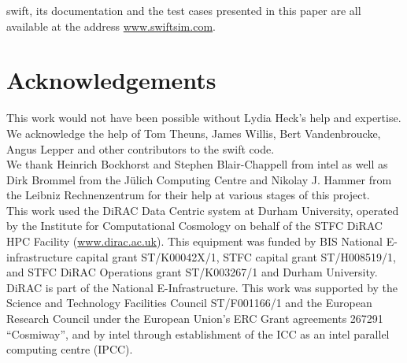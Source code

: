 \documentclass{sig-alternate-05-2015}
\newcommand{\swift}{{\sc swift}\xspace}
\newcommand{\web}{\url{www.swiftsim.com}}
\begin{document}
\swift, its documentation and the test cases presented in this paper are all
available at the address \web.



\section{Acknowledgements}
This work would not have been possible without Lydia Heck's help and
expertise. We acknowledge the help of Tom Theuns, James Willis, Bert
Vandenbroucke, Angus Lepper and other contributors to the \swift
code. \\ We thank Heinrich Bockhorst and Stephen Blair-Chappell from {\sc
  intel} as well as Dirk Brommel from the J\"ulich Computing Centre
and Nikolay J. Hammer from the Leibniz Rechnenzentrum for their help
at various stages of this project.\\ This work used the DiRAC Data
Centric system at Durham University, operated by the Institute for
Computational Cosmology on behalf of the STFC DiRAC HPC Facility
(\url{www.dirac.ac.uk}). This equipment was funded by BIS National
E-infrastructure capital grant ST/K00042X/1, STFC capital grant
ST/H008519/1, and STFC DiRAC Operations grant ST/K003267/1 and Durham
University. DiRAC is part of the National E-Infrastructure. This work
was supported by the Science and Technology Facilities Council
ST/F001166/1 and the European Research Council under the European
Union's ERC Grant agreements 267291 ``Cosmiway'', and by {\sc intel}
through establishment of the ICC as an {\sc intel} parallel computing
centre (IPCC).

\nocite{*}


\end{document}
